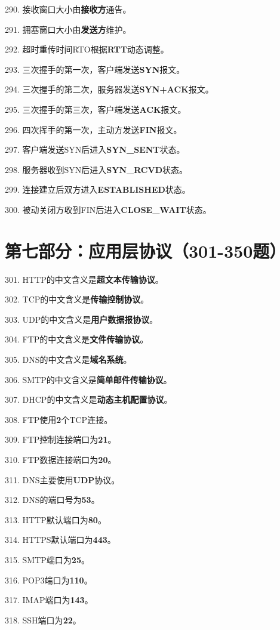 \documentclass[12pt,a4paper,openany]{ctexbook}
\begin{document}
290. 接收窗口大小由\textbf{接收方}通告。

291. 拥塞窗口大小由\textbf{发送方}维护。

292. 超时重传时间RTO根据\textbf{RTT}动态调整。

293. 三次握手的第一次，客户端发送\textbf{SYN}报文。

294. 三次握手的第二次，服务器发送\textbf{SYN+ACK}报文。

295. 三次握手的第三次，客户端发送\textbf{ACK}报文。

296. 四次挥手的第一次，主动方发送\textbf{FIN}报文。

297. 客户端发送SYN后进入\textbf{SYN\_SENT}状态。

298. 服务器收到SYN后进入\textbf{SYN\_RCVD}状态。

299. 连接建立后双方进入\textbf{ESTABLISHED}状态。

300. 被动关闭方收到FIN后进入\textbf{CLOSE\_WAIT}状态。

\section{第七部分：应用层协议（301-350题）}

301. HTTP的中文含义是\textbf{超文本传输协议}。

302. TCP的中文含义是\textbf{传输控制协议}。

303. UDP的中文含义是\textbf{用户数据报协议}。

304. FTP的中文含义是\textbf{文件传输协议}。

305. DNS的中文含义是\textbf{域名系统}。

306. SMTP的中文含义是\textbf{简单邮件传输协议}。

307. DHCP的中文含义是\textbf{动态主机配置协议}。

308. FTP使用\textbf{2}个TCP连接。

309. FTP控制连接端口为\textbf{21}。

310. FTP数据连接端口为\textbf{20}。

311. DNS主要使用\textbf{UDP}协议。

312. DNS的端口号为\textbf{53}。

313. HTTP默认端口为\textbf{80}。

314. HTTPS默认端口为\textbf{443}。

315. SMTP端口为\textbf{25}。

316. POP3端口为\textbf{110}。

317. IMAP端口为\textbf{143}。

318. SSH端口为\textbf{22}。
\end{document}
